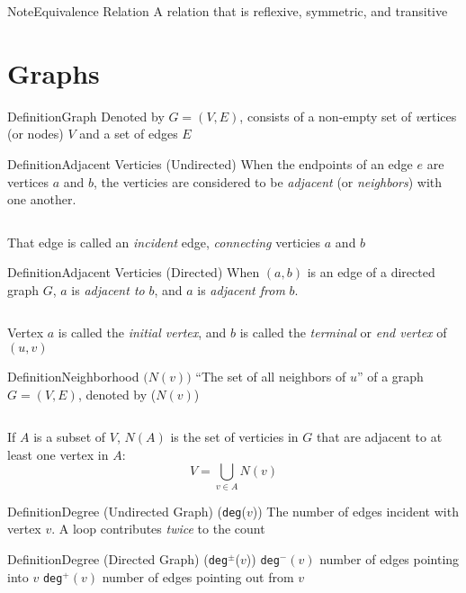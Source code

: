 \documentclass{MathNotes}
\newenvironment{definition}[1]{\begin{RedBox}{Definition}{#1}}{\end{RedBox}}
\newenvironment{note}[1]{\begin{YellowBox}{Note}{#1}}{\end{YellowBox}}
\newcommand{\bl}{
	\newline$ $\newline
}
\begin{document}
\begin{note}{Equivalence Relation}
	A relation that is reflexive, symmetric, and transitive
\end{note}

\section{Graphs}\label{sec:graphs}
\begin{definition}{Graph}\label{def:graph}
	Denoted by $G=(V,E)$, consists of a non-empty set of \textit vertices (or nodes) $V$ and a set of edges $E$
\end{definition}
\begin{multicols}{2}
	\begin{definition}{Adjacent Verticies (Undirected)}\label{adjacent-verticies-undirected}
		When the endpoints of an edge $e$ are vertices $a$ and $b$, the verticies
		are considered to be \textit{adjacent} (or \textit{neighbors}) with one
		another.
		\bl
		That edge is called an \textit{incident} edge, \textit{connecting} verticies
		$a$ and $b$
	\end{definition}
	\begin{definition}{Adjacent Verticies (Directed)}\label{def:adjacent-verticies-directed}
		When $(a,b)$ is an edge of a directed graph $G$, $a$ is \textit{adjacent to}
		$b$, and $a$ is \textit{adjacent from} $b$.
		\bl
		Vertex $a$ is called the \textit{initial vertex}, and $b$ is called
		the \textit{terminal} or \textit{end vertex} of $(u,v)$
	\end{definition}
\end{multicols}

\begin{definition}{Neighborhood $\big(N(v)\big)$}\label{def:neighborhood}
	``The set of all neighbors of $u$'' of a graph $G=(V,E)$, denoted by ($N(v)$)
	\bl
	If $A$ is a subset of $V$, $N(A)$ is the set of verticies in $G$ that are
	adjacent to at least one vertex in $A$: \[V=\bigcup_{v\in A}N(v)\]
\end{definition}

\newpage
\begin{multicols}{2}
	\begin{definition}{Degree (Undirected Graph) \big(\texttt{deg}($v$)\big)}\label{def:degree-undirected}
		The number of edges incident with vertex $v$. A loop contributes
		\textit{twice} to the count
	\end{definition}
	\begin{definition}{Degree (Directed Graph) \big(\texttt{deg}$^{\pm}$($v$)\big)}\label{def:degree-directed}
		\texttt{deg}$^-(v)$ number of edges pointing into $v$
		\newline
		\texttt{deg}$^+(v)$ number of edges pointing out from $v$
	\end{definition}
\end{multicols}
\end{document}
